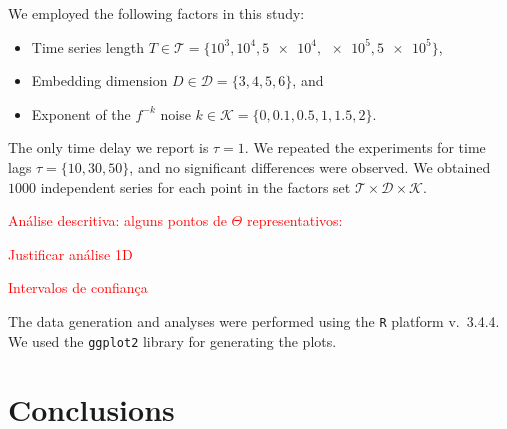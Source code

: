 \documentclass[sts]{imsart}
\begin{document}
We employed the following factors in this study:
\begin{itemize}
\item Time series length $T\in\mathcal T=\{10^3,10^4, \num[scientific-notation=true]{5 e4}, \num[scientific-notation=true]{e5}, \num[scientific-notation=true]{5 e5}\}$,
\item Embedding dimension $D\in\mathcal D=\{3, 4, 5, 6\}$, and
\item Exponent of the $f^{-k}$ noise $k\in\mathcal K=\{0, 0.1, 0.5, 1, 1.5, 2\}$.
\end{itemize}
The only time delay we report is $\tau=1$.
We repeated the experiments for time lags $\tau=\{10,30,50\}$, and no significant differences were observed.
We obtained $1000$ independent series for each point in the factors set $\mathcal T\times \mathcal D\times \mathcal K$.

\textcolor{red}{An\'alise descritiva: alguns pontos de $\Theta$ representativos:} 

\textcolor{red}{Justificar an\'alise 1D}

\textcolor{red}{Intervalos de confian\c ca}

The data generation and analyses were performed using the \texttt R platform \cite{Rmanual} v.~3.4.4.
We used the \texttt{ggplot2} library \cite{ggplot2Wickman} for generating the plots.

\section{Conclusions}\label{Sec:Conclusions}


\end{document}

